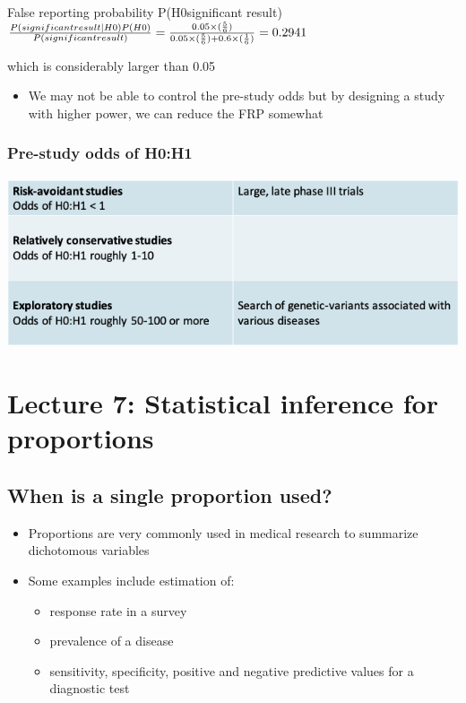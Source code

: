 \documentclass[
]{book}
\providecommand{\tightlist}{%
  \setlength{\itemsep}{0pt}\setlength{\parskip}{0pt}}
\begin{document}
False reporting probability P(H0\textbar significant result)
\(\frac{P(significant\space result|H0)P(H0)}{P(significant\space result)}=\frac{0.05\times(\frac{5}{6})}{0.05\times(\frac{5}{6})+0.6\times(\frac{1}{6})}=0.2941\)

which is considerably larger than 0.05

\begin{itemize}
\tightlist
\item
  We may not be able to control the pre-study odds but by designing a study with higher power, we can reduce the FRP somewhat
\end{itemize}

\hypertarget{pre-study-odds-of-h0h1}{%
\subsection{Pre-study odds of H0:H1}\label{pre-study-odds-of-h0h1}}

\includegraphics[width=1\linewidth]{./6_60}

\hypertarget{lecture-7-statistical-inference-for-proportions}{%
\chapter{Lecture 7: Statistical inference for proportions}\label{lecture-7-statistical-inference-for-proportions}}

\hypertarget{when-is-a-single-proportion-used}{%
\section{When is a single proportion used?}\label{when-is-a-single-proportion-used}}

\begin{itemize}
\tightlist
\item
  Proportions are very commonly used in medical research to summarize dichotomous variables
\item
  Some examples include estimation of:

  \begin{itemize}
  \tightlist
  \item
    response rate in a survey
  \item
    prevalence of a disease
  \item
    sensitivity, specificity, positive and negative predictive values for a diagnostic test
  \end{itemize}
\end{itemize}
\end{document}
